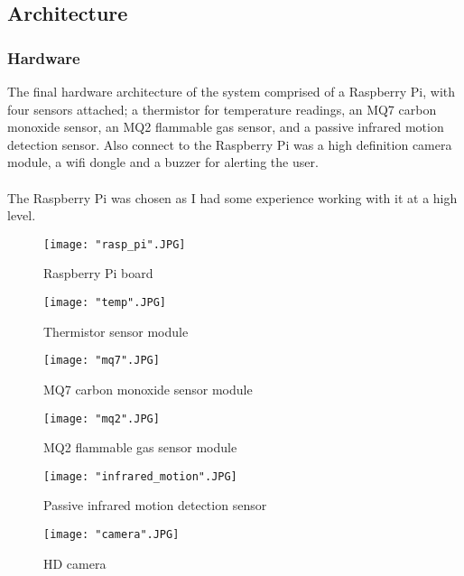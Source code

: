 \documentclass{article}
\begin{document}
\subsection{Architecture}

\subsubsection{Hardware}
The final hardware architecture of the system comprised of a Raspberry Pi, with four sensors attached; a thermistor for temperature readings, an MQ7 carbon monoxide sensor, an MQ2 flammable gas sensor, and a passive infrared motion detection sensor. Also connect to the Raspberry Pi was a high definition camera module, a wifi dongle and a buzzer for alerting the user. \\\\
The Raspberry Pi was chosen as I had some experience working with it at a high level.

\begin{figure}[H]
\centering
\texttt{[image: "rasp\_pi".JPG]}
\caption{Raspberry Pi board}
\label{fig:hard_rasp_pi}
\end{figure}

\begin{figure}[H]
\centering
\texttt{[image: "temp".JPG]}
\caption{Thermistor sensor module}
\label{fig:hard_temp}
\end{figure}

\begin{figure}[H]
\centering
\texttt{[image: "mq7".JPG]}
\caption{MQ7 carbon monoxide sensor module}
\label{fig:hard_mq7}
\end{figure}

\begin{figure}[H]
\centering
\texttt{[image: "mq2".JPG]}
\caption{MQ2 flammable gas sensor module}
\label{fig:hard_mq2}
\end{figure}

\begin{figure}[H]
\centering
\texttt{[image: "infrared\_motion".JPG]}
\caption{Passive infrared motion detection sensor}
\label{fig:hard_motion}
\end{figure}

\begin{figure}[H]
\centering
\texttt{[image: "camera".JPG]}
\caption{HD camera}
\label{fig:hard_camera}
\end{figure}
\end{document}
